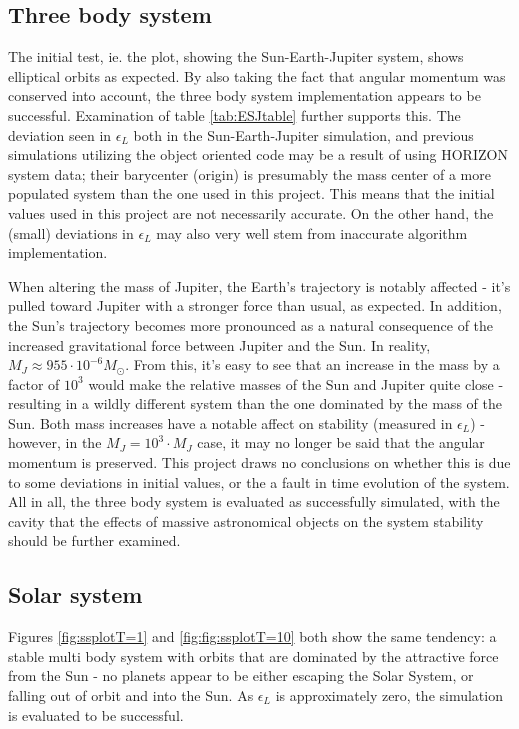 \documentclass[%
oneside,                 %
final,                   %
10pt]{article}
\begin{document}
\subsection{Three body system}
\label{subsec:Discofres:3B}
The initial test, ie. the plot, showing the Sun-Earth-Jupiter system, shows elliptical orbits as expected. By also taking the fact that angular momentum was conserved into account, the three body system implementation appears to be successful. Examination of table \ref{tab:ESJtable} further supports this. The deviation seen in $\epsilon_L$ both in the Sun-Earth-Jupiter simulation, and previous simulations utilizing the object oriented code may be a result of using HORIZON system data; their barycenter (origin) is presumably the mass center of a more populated system than the one used in this project. This means that the initial values used in this project are not necessarily accurate. On the other hand, the (small) deviations in $\epsilon_L$ may also very well stem from inaccurate algorithm implementation. \newline

When altering the mass of Jupiter, the Earth's trajectory is notably affected - it's pulled toward Jupiter with a stronger force than usual, as expected. In addition, the Sun's trajectory becomes more pronounced as a natural consequence of the increased gravitational force between Jupiter and the Sun. In reality, $ M_{J}\approx 955 \cdot 10^{-6} M_{\odot}$. From this, it's easy to see that an increase in the mass by a factor of $10^3$ would make the relative masses of the Sun and Jupiter quite close - resulting in a wildly different system than the one dominated by the mass of the Sun. Both mass increases have a notable affect on stability (measured in $\epsilon_L$) - however, in the $M_J=10^3 \cdot M_J$ case, it may no longer be said that the angular momentum is preserved. This project draws no conclusions on whether this is due to some deviations in initial values, or the a fault in time evolution of the system. All in all, the three body system is evaluated as successfully simulated, with the cavity that the effects of massive astronomical objects on the system stability should be further examined.

\subsection{Solar system}
Figures \ref{fig:ssplotT=1} and \ref{fig:fig:ssplotT=10} both show the same tendency: a stable multi body system with orbits that are dominated by the attractive force from the Sun - no planets appear to be either escaping the Solar System, or falling out of orbit and into the Sun. As $\epsilon_L$ is approximately zero, the simulation is evaluated to be successful. 
\end{document}
